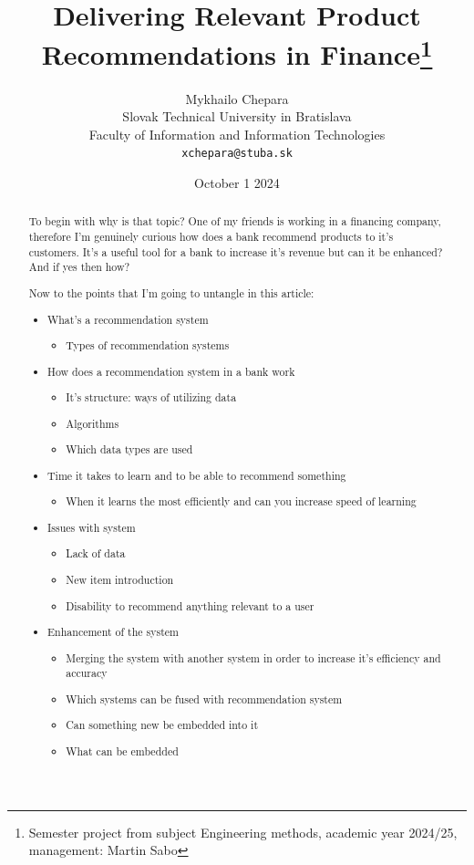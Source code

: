 \documentclass[10pt,twoside,english,a4paper]{article}
\title{Delivering Relevant Product Recommendations in Finance\thanks{Semester project from subject Engineering methods, academic year 2024/25, management: Martin Sabo}} %
\author{Mykhailo Chepara\\[2pt]
	{\small Slovak Technical University in Bratislava}\\
	{\small Faculty of Information and Information Technologies}\\
	{\small \texttt{xchepara@stuba.sk}}
	}
\date{\small October 1 2024} %
\begin{document}
\maketitle


\begin{abstract}
To begin with why is that topic? 
One of my friends is working in a financing company, therefore I'm genuinely curious how does a bank recommend products to it's customers. It's a useful tool for a bank to increase it's revenue but can it be enhanced? And if yes then how?

Now to the points that I'm going to untangle in this article:
\begin{itemize}
    \item What's a recommendation system
    \begin{itemize}
        \item Types of recommendation systems
    \end{itemize}
    
    \item How does a recommendation system in a bank work
    \begin{itemize} 
             \item It's structure: ways of utilizing data
             \item Algorithms
             \item Which data types are used
    \end{itemize}
    
    \item Time it takes to learn and to be able to recommend something
    \begin{itemize}
        \item When it learns the most efficiently and can you increase speed of learning
    \end{itemize}
    
    \item Issues with system
    \begin{itemize}
        \item Lack of data
        \item New item introduction
        \item Disability to recommend anything relevant to a user
    \end{itemize}
    
    \item Enhancement of the system
    \begin{itemize}
        \item Merging the system with another system in order to increase it's efficiency and accuracy
        \item Which systems can be fused with recommendation system
        \item Can something new be embedded into it
        \item What can be embedded
    

\end{itemize}
\end{itemize}
\end{abstract}
\end{document}
